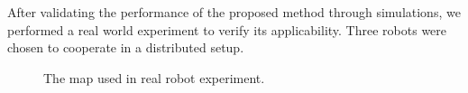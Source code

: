 \documentclass[smallcondensed]{svjour3}
\begin{document}
After validating the performance of the proposed method through simulations, we performed a real world experiment to verify its applicability. Three robots were chosen to cooperate in a distributed setup. 

\begin{figure}[h]
\centering
{}
\caption{The map used in real robot experiment.}
\label{fig:depmap}
\end{figure}
\end{document}
